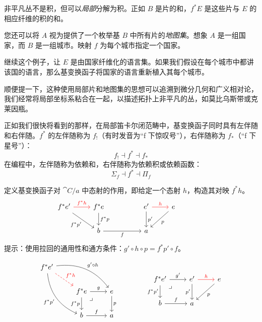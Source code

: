 \documentclass[DaoFP]{subfiles}
\begin{document}
 非平凡丛不是积，但可以\emph{局部}分解为积。正如 $B$ 是片的和，$f^*E$ 是这些片与 $E$ 的相应纤维的积的和。

 您还可以将 $A$ 视为提供了一个枚举基 $B$ 中所有片的\emph{地图集}。想象 $A$ 是一组国家，而 $B$ 是一组城市。映射 $f$ 为每个城市指定一个国家。

 继续这个例子，让 $E$ 是由国家纤维化的语言集。如果我们假设在每个城市中都讲该国的语言，那么基变换函子将国家的语言重新植入其每个城市。

 顺便提一下，这种使用局部片和地图集的思想可以追溯到微分几何和广义相对论，我们经常将局部坐标系粘合在一起，以描述拓扑上非平凡的丛，如莫比乌斯带或克莱因瓶。

 正如我们很快将看到的那样，在局部笛卡尔闭范畴中，基变换函子同时具有左伴随和右伴随。$f^*$ 的左伴随称为 $f_!$（有时发音为“f 下惊叹号”），右伴随称为 $f_*$（“f 下星号”）：
 \[ f_! \dashv f^* \dashv f_* \]
 在编程中，左伴随称为依赖和，右伴随称为依赖积或依赖函数：
 \[ \Sigma_f \dashv f^* \dashv \Pi_f \]

 \begin{exercise}
  定义基变换函子对 $\cat C/a$ 中态射的作用，即给定一个态射 $h$，构造其对映 $f^* h$。
  \[
   \begin{tikzcd}
    f^* e'
    \arrow[dr, "f^*p'"']
    \arrow[r, red, "f^* h"]
    & f^* e
    \arrow[d, "f^*p"]
    && e'
    \arrow[d, "p'"]
    \arrow[r, red, "h"]
    & e
    \arrow[dl, "p"]
    \\
    & b
    \arrow[rr, "f"']
    &&a
   \end{tikzcd}
   \hspace{40pt}
   \begin{tikzcd}
   \end{tikzcd}
  \]
  提示：使用拉回的通用性和通方条件：$g' \circ h \circ p = f^* p' \circ f$。

  \[
   \begin{tikzcd}
    f^* e'
    \arrow[dr, dashed, red, "f^* h"]
    \arrow[drr, bend left, "g' \circ h"]
    \arrow[ddr, bend right, "f^* p'"']
    \\
    &f^* e
    \arrow[r, "g"]
    \arrow[d, "f^* p"']
    \arrow[dr, phantom,  , very near start, "\lrcorner"]
    &e
    \arrow[d, "p"]
    \\
    &b
    \arrow[r, "f"]
    &a
   \end{tikzcd}
   \hspace{40pt}
   \begin{tikzcd}
    f^* e'
    \arrow[r, "g'"]
    \arrow[d, "f^* p'"']
    \arrow[dr, phantom,  , very near start, "\lrcorner"]
    & e'
    \arrow[d, "p'"']
    \arrow[r, red, "h"]
    & e
    \arrow[dl, "p"]
    \\
    b
    \arrow[r, "f"]
    & a
   \end{tikzcd}
  \]

 \end{exercise}
\end{document}
